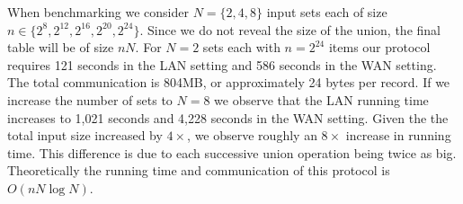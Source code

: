 When benchmarking we consider $N=\{2,4,8\}$ input sets each of size $n\in \{2^8, 2^{12}, 2^{16}, 2^{20}, 2^{24}\}$. Since we do not reveal the size of the union, the final table will be of size $nN$. For $N=2$ sets each with $n=2^{24}$ items our protocol requires 121 seconds in the LAN setting and 586 seconds in the WAN setting. The total communication is 804MB, or approximately 24 bytes per record. If we increase the number of sets to $N=8$ we observe that the LAN running time increases to 1,021 seconds and 4,228 seconds  in the WAN setting. Given the the total input size increased by $4\times$, we observe roughly an $8\times$ increase in running time. This difference is due to each successive union operation being twice as big. Theoretically the running time and communication of this protocol is $O(nN\log N)$.

